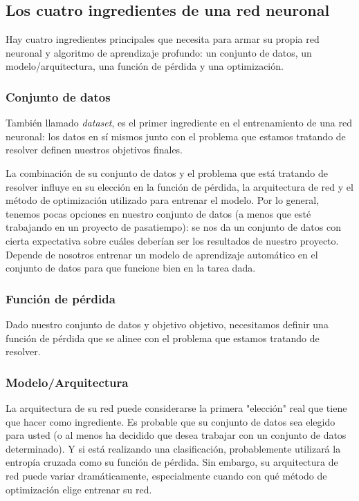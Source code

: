 \documentclass[a4paper,12pt]{article}
\begin{document}
\subsection{Los cuatro ingredientes de una red neuronal}
Hay cuatro ingredientes principales \citep{rosebrock2017deep} que necesita para armar su propia red neuronal y algoritmo de aprendizaje profundo: un conjunto de datos, un modelo/arquitectura, una función de pérdida y una optimización.
\subsubsection{Conjunto de datos}
También llamado \textit{dataset}, es el primer ingrediente en el entrenamiento de una red neuronal: los datos en sí mismos junto con el problema que estamos tratando de resolver definen nuestros objetivos finales.

La combinación de su conjunto de datos y el problema que está tratando de resolver influye en su elección en la función de pérdida, la arquitectura de red y el método de optimización utilizado para entrenar el modelo. Por lo general, tenemos pocas opciones en nuestro conjunto de datos (a menos que esté trabajando en un proyecto de pasatiempo): se nos da un conjunto de datos con cierta expectativa sobre cuáles deberían ser los resultados de nuestro proyecto. Depende de nosotros entrenar un modelo de aprendizaje automático en el conjunto de datos para que funcione bien en la tarea dada.

\subsubsection{Función de pérdida}
Dado nuestro conjunto de datos y objetivo objetivo, necesitamos definir una función de pérdida que se alinee con el problema que estamos tratando de resolver.

\subsubsection{Modelo/Arquitectura}
La arquitectura de su red puede considerarse la primera "elección" real que tiene que hacer como ingrediente. Es probable que su conjunto de datos sea elegido para usted (o al menos ha decidido que desea trabajar con un conjunto de datos determinado). Y si está realizando una clasificación, probablemente utilizará la entropía cruzada como su función de pérdida.
Sin embargo, su arquitectura de red puede variar dramáticamente, especialmente cuando con qué método de optimización elige entrenar su red.
\end{document}
